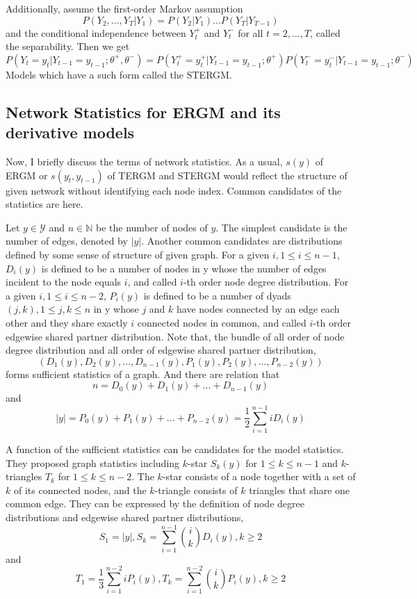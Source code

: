 \documentclass[aspectratio=169,ignorenonframetext,9pt]{beamer}
\theoremstyle{plain}
\theoremstyle{definition}
\begin{document}
Additionally, assume the first-order Markov assumption
\[P(Y_2,...,Y_T|Y_1)=P(Y_2|Y_1)...P(Y_T|Y_{T-1})\]
and the conditional independence between $Y_t^+$ and $Y_t^-$ for all $t=2,...,T$, called the separability.
Then we get
\[P(Y_t=y_t|Y_{t-1}=y_{t-1};\theta^+,\theta^-)=P(Y_t^+=y_t^+|Y_{t-1}=y_{t-1};\theta^+) P(Y_t^-=y_t^-|Y_{t-1}=y_{t-1};\theta^-)\]
Models which have a such form called the STERGM.



\subsection{Network Statistics for ERGM and its derivative models}
Now, I briefly discuss the terms of network statistics.
As a usual, $s(y)$ of ERGM or $s(y_{t}^.,y_{t-1})$ of TERGM and STERGM would 
reflect the structure of given network without identifying each node index.
Common candidates of the statistics are here.

Let $y\in\mathcal{Y}$ and $n\in\mathbb{N}$ be the number of nodes of $y$.
The simplest candidate is the number of edges, denoted by $|y|$.
Another common candidates are distributions defined by some sense of structure of given graph.
For a given $i, 1\leq i \leq n-1$, $D_i(y)$ is defined to be a number of nodes in y whose the number of edges incident to the node equals $i$,
and called $i$-th order node degree distribution. 
For a given $i, 1\leq i \leq n-2$, $P_i(y)$ is defined to be a number of dyads $(j,k), 1\leq j,k \leq n$
in y whose $j$ and $k$ have nodes connected by an edge each other and they share exactly $i$ connected nodes in common,
and called $i$-th order edgewise shared partner distribution.
Note that, the bundle of all order of node degree distribution and all order of edgewise shared partner distribution,
\[(D_1(y),D_2(y),...,D_{n-1}(y),P_1(y),P_2(y),...,P_{n-2}(y))\] 
forms sufficient statistics of a graph.
And there are relation that
\[n=D_0(y)+D_1(y)+...+D_{n-1}(y)\]
and
\[|y|=P_0(y)+P_1(y)+...+P_{n-2}(y)=\frac{1}{2}\sum_{i=1}^{n-1} iD_i(y)\]


A function of the sufficient statistics can be candidates for the model statistics.
They proposed graph statistics including $k$-star $S_k(y)$ for $1\leq k \leq n-1$ and $k$-triangles $T_k$ for $1\leq k \leq n-2$.
The $k$-star consists of a node together with a set of $k$ of its connected nodes,
and the $k$-triangle consists of $k$ triangles that share one common edge.
They can be expressed by the definition of node degree distributions and edgewise shared partner distributions,
\[S_1 = |y|, 
S_k = \sum_{i=1}^{n-1} \binom{i}{k} D_i(y), k\geq 2\]
and
\[T_1 = \frac{1}{3}\sum_{i=1}^{n-2} iP_i(y),
T_k = \sum_{i=1}^{n-2} \binom{i}{k} P_i(y), k\geq 2\]
\end{document}
